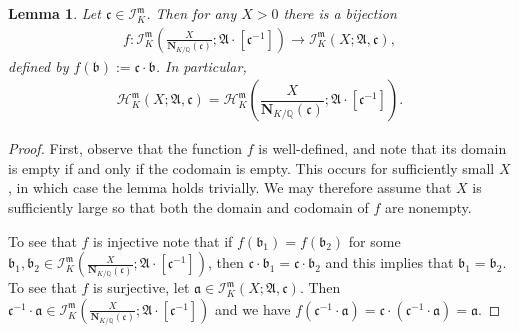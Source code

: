 \documentclass[11pt, reqno]{amsart}
\numberwithin{equation}{section}
\newtheorem{lemma}[theorem]{Lemma}
\newcommand{\Q}{\mathbb{Q}}
\newcommand{\Nrm}[2]{\mathbf{N}_{#1}(#2)}
\theoremstyle{definition}
\begin{document}
\begin{lemma}\label{lem:number-of-ideals-in-a-ray-class-divisible-by-an-ideal}
Let $\mathfrak{c} \in \mathcal{I}_K^{\mathfrak{m}}$.
Then for any $X > 0$ there is a bijection
\begin{align*}
f \colon \mathcal{I}_K^{\mathfrak{m}} \left(\frac{X}{\Nrm{K/\Q}{\mathfrak{c}}}; \mathfrak{A} \cdot [\mathfrak{c}^{-1}] \right) \longrightarrow \mathcal{I}_K^{\mathfrak{m}}(X; \mathfrak{A}, \mathfrak{c}),
\end{align*}
defined by $f(\mathfrak{b}) := \mathfrak{c} \cdot \mathfrak{b}$.
In particular, 
\begin{align*}
\mathcal{H}_K^{\mathfrak{m}}(X; \mathfrak{A}, \mathfrak{c}) 
= \mathcal{H}_K^{\mathfrak{m}}\left( \dfrac{X}{\Nrm{K/\Q}{\mathfrak{c}}}; \mathfrak{A} \cdot[\mathfrak{c}^{-1}] \right).
\end{align*}
\end{lemma}

\begin{proof}
First, observe that the function $f$ is well-defined, and note that its domain is empty if and only if the codomain is empty. This occurs for sufficiently small $X$, in which case the lemma holds trivially. We may therefore assume that $X$ is sufficiently large so that both the domain and codomain of $f$ are nonempty.

To see that $f$ is injective note that if $f(\mathfrak{b}_1) = f(\mathfrak{b}_2)$ for some $\mathfrak{b}_1, \mathfrak{b}_2 \in \mathcal{I}_K^{\mathfrak{m}} \left(\frac{X}{\Nrm{K/\Q}{\mathfrak{c}}}; \mathfrak{A} \cdot [\mathfrak{c}^{-1}] \right)$, then $\mathfrak{c} \cdot \mathfrak{b}_1 = \mathfrak{c} \cdot \mathfrak{b}_2$ and this implies that $\mathfrak{b}_1 = \mathfrak{b}_2$. To see that $f$ is surjective, let $\mathfrak{a} \in \mathcal{I}_K^{\mathfrak{m}}(X; \mathfrak{A}, \mathfrak{c})$. Then $\mathfrak{c}^{-1} \cdot \mathfrak{a} \in \mathcal{I}_K^{\mathfrak{m}} \left(\frac{X}{\Nrm{K/\Q}{\mathfrak{c}}}; \mathfrak{A} \cdot [\mathfrak{c}^{-1}] \right)$ and we have $f(\mathfrak{c}^{-1} \cdot \mathfrak{a}) = \mathfrak{c} \cdot (\mathfrak{c}^{-1} \cdot \mathfrak{a}) = \mathfrak{a}$.
\end{proof}
\end{document}
